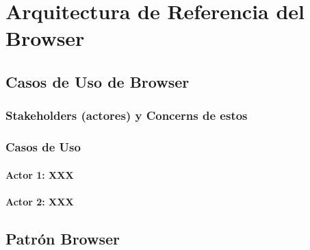 \chapter{Arquitectura de Referencia del Browser}
\label{chap4:ArqRefBrowser}



\section{Casos de Uso de Browser}
	\subsection{Stakeholders (actores) y Concerns de estos}

	\subsection{Casos de Uso}

		\subsubsection{Actor 1: XXX}


		\subsubsection{Actor 2: XXX}

\section{Patrón Browser}

